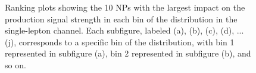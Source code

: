 \begin{figure}[ht]
  \quad
  \quad
  \quad
  \quad

  \caption{Ranking plots showing the 10 NPs with the largest impact on the \tty production signal strength in each bin of the \ptgamma distribution in the single-lepton channel. Each subfigure, labeled (a), (b), (c), (d), ... (j), corresponds to a specific bin of the \ptgamma distribution, with bin 1 represented in subfigure (a), bin 2 represented in subfigure (b), and so on.}
  \label{fig:ranking_ljet_prod}
\end{figure}
\FloatBarrier


